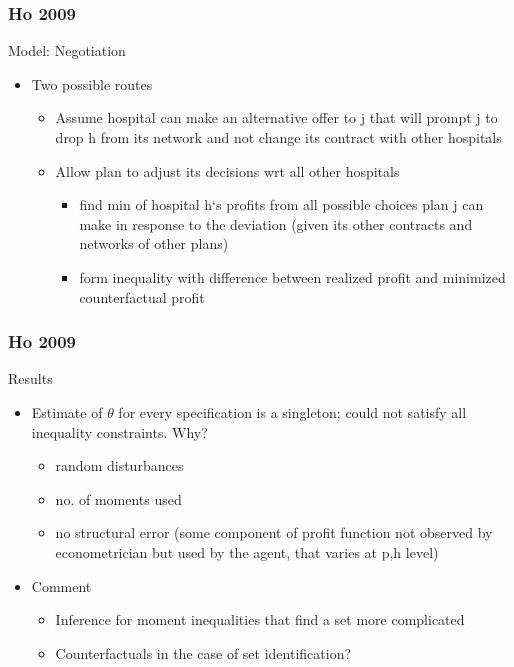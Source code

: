 \documentclass[notes=show]{beamer}
\begin{document}
\begin{frame}
\frametitle{Ho 2009}

Model: Negotiation
\begin{itemize}
\item Two possible routes
\begin{itemize}
\item Assume hospital can make an alternative offer to j that will prompt j to drop h from its network and not change its contract with other hospitals
\item Allow plan to adjust its decisions wrt all other hospitals
\begin{itemize}
\item find min of hospital h`s profits from all possible choices plan j can make in response to the deviation (given its other contracts and networks of other plans)
\item form inequality with difference between realized profit and minimized counterfactual profit
\end{itemize}

\end{itemize}
\end{itemize}

\end{frame}

\begin{frame}
\frametitle{Ho 2009}

Results
\begin{itemize}
\item Estimate of $\theta$ for every specification is a singleton; could not satisfy all inequality constraints.  Why?
\begin{itemize}
\item random disturbances
\item no. of moments used
\item no structural error (some component of profit function not observed by econometrician but used by the agent, that varies at p,h level)
\end{itemize}
\item Comment
\begin{itemize}
\item Inference for moment inequalities that find a set more complicated
\item Counterfactuals in the case of set identification?
\end{itemize}
\end{itemize}
\end{frame}
\end{document}
